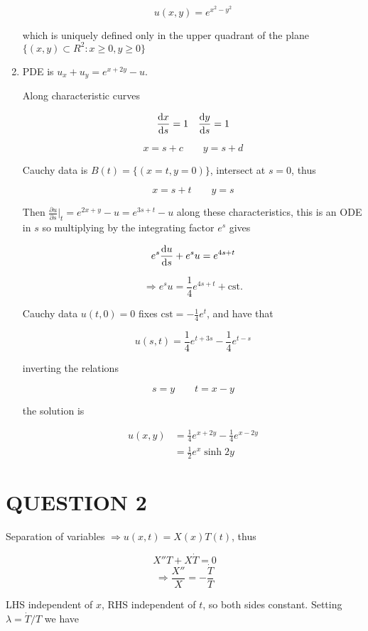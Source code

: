 \documentclass[a4paper]{article}
\begin{document}
\begin{enumerate}
	\[ u(x,y) = e^{x^{2} - y^{2}} \]
	
	which is uniquely defined only in the upper quadrant of the plane $ \{ (x,y) \subset R^{2} : x \geq 0, y \geq 0 \} $
	
	\item PDE is $ u_{x} + u_{y} = e^{x + 2y} - u $.
	
	Along characteristic curves
	
	\[ \frac{\mathrm{d} x}{\mathrm{d} s} = 1 \quad \frac{\mathrm{d} y}{\mathrm{d} s} = 1  \]
	
	
	\[ x = s + c \qquad y = s + d \]
	
	Cauchy data is $ B(t) = \{ (x = t, y = 0) \} $, intersect at $ s = 0 $, thus
	
	\[ x = s + t  \qquad y = s \]

	Then $ \frac{\partial u }{\partial s} \Big|_{t} = e^{2x + y} - u = e^{3s + t} - u $ along these characteristics, this is an ODE in $ s $ so multiplying by the integrating factor $ e^{s} $ gives
	
	\[ e^{s} \frac{\mathrm{d} u}{\mathrm{d} s} + e^{s} u = e^{4s + t}  \]
	
	\[ \Rightarrow e^{s} u = \frac{1}{4} e^{4s + t } + \text{cst.} \]
	
	Cauchy data  $ u(t,0) = 0 $ fixes $ \text{cst} = -  \frac{1}{4} e^{t} $, and have that
	
	\[ u(s,t) = \frac{1}{4} e^{t  + 3s} -  \frac{1}{4} e^{t-s}  \]


	inverting the relations
	
	\[ s = y \qquad t = x - y \]
	
	the solution is
	
	\begin{align*}
	u(x,y) & = \frac{1}{4}e^{x + 2y} - \frac{1}{4} e^{x - 2y}  \\
	& = \frac{1}{2}e^{x} \sinh 2y
	\end{align*}
	
\end{enumerate}

\section{QUESTION 2}

Separation of variables $ \Rightarrow u(x,t) = X(x) T(t) $, thus

\[ X''T + X \dot{T} = 0 \]
\[ \Rightarrow \frac{X''}{X} = - \frac{\dot{T}}{T}  \]

LHS independent of $ x $, RHS independent of $ t $, so both sides constant.
Setting $ \lambda = \dot{T} / T $ we have
\end{document}
